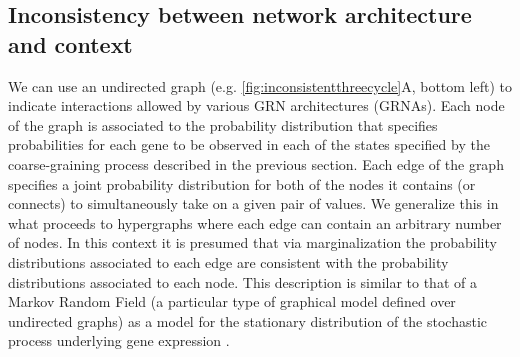 \subsection{Inconsistency between network architecture and context}
We can use an undirected graph (e.g. \ref{fig:inconsistentthreecycle}A, bottom left) to indicate interactions allowed by various GRN architectures (GRNAs). Each node of the graph is associated to the probability distribution that specifies probabilities for each gene to be observed in each of the states specified by the coarse-graining process described in the previous section. Each edge of the graph specifies a joint probability distribution for both of the nodes it contains (or connects) to simultaneously take on a given pair of values. We generalize this in what proceeds to hypergraphs where each edge can contain an arbitrary number of nodes. In this context it is presumed that via marginalization the probability distributions associated to each edge are consistent with the probability distributions associated to each node. This description is similar to that of a Markov Random Field (a particular type of graphical model defined over undirected graphs) as a model for the stationary distribution of the stochastic process underlying gene expression \cite{Lauritzen1996,Chen2013a}.

